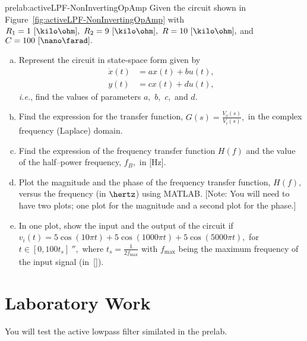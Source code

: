 \begin{prelab}{prelab:activeLPF-NonInvertingOpAmp}
Given the circuit shown in Figure~\ref{fig:activeLPF-NonInvertingOpAmp} with $R_1 = 1~[\kilo\ohm],~R_2=9~[\kilo\ohm],~R=10~[\kilo\ohm],$ and $C =100~[\nano\farad].$ 
      \begin{enumerate}[(a)]
      \item  Represent the circuit in state-space form given by 
        \begin{align*}
          \dot x(t) &= a x(t) + bu(t),\\
          y(t) &= cx(t) + du(t),
        \end{align*}
        \textit{i.e.}, find the values of parameters $a,$ $b,$ $c,$ and $d.$  
      \item Find the expression for the transfer function, $G(s) = \frac{V_o(s)}{V_i(s)},$ in the complex frequency (Laplace) domain.
        
      \item Find the expression of the frequency transfer function $H(f)$ and the value of the half--power frequency, $f_B,$ in [Hz].
      \item Plot the magnitude and the phase of the frequency transfer function, $H(f),$ versus the frequency (in $\hertz$) using MATLAB. [Note: You will need to have two plots; one plot for the magnitude and a second plot for the phase.]
      \item  In one plot, show the input and the output of the circuit if $v_i(t) = 5\cos(10\pi t) + 5\cos(1000\pi t) +5\cos(5000\pi t),$ for $t\in[0,100t_s]~\second,$ where $t_s=\frac{1}{2f_{\mathrm{max}}}$ with $f_{\mathrm{max}}$ being the maximum frequency of the input signal (in~[\hertz]).
        \end{enumerate}
\end{prelab}

\section{Laboratory Work}

You will test the active lowpass filter similated in the prelab. 


